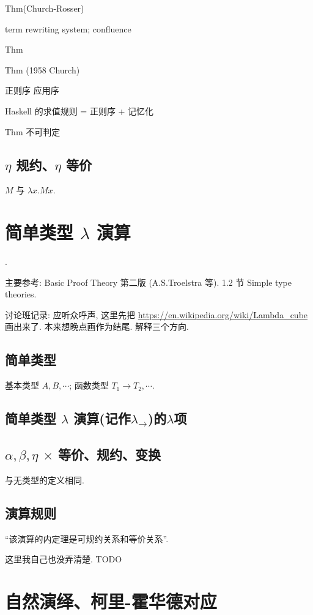\documentclass{article}
\def\a{\alpha}
\def\b{\beta}
\def\l{\lambda}
\begin{document}
Thm(Church-Rosser)

term rewriting system; confluence

Thm

Thm (1958 Church)

正则序 应用序

Haskell 的求值规则 = 正则序 + 记忆化

Thm 不可判定

\subsection{$\eta$ 规约、$\eta$ 等价}

$M$ 与 $\l x.M x$.


\section{简单类型 $\l$ 演算}
.

主要参考: Basic Proof Theory 第二版 (A.S.Troelstra 等). 1.2 节 Simple type theories.

讨论班记录: 应听众呼声, 这里先把 \url{https://en.wikipedia.org/wiki/Lambda_cube}画出来了. 本来想晚点画作为结尾. 解释三个方向.

\subsection{简单类型}

基本类型 $A,B,\cdots$; 函数类型 $T_1\to T_2,\cdots$.

\subsection{简单类型 $\l$ 演算(记作$\l_\to$)的$\l$项}

\subsection{$\a,\b,\eta$ $\times$ 等价、规约、变换}

与无类型的定义相同.

\subsection{演算规则}

``该演算的内定理是可规约关系和等价关系''.

这里我自己也没弄清楚. TODO

\section{自然演绎、柯里-霍华德对应}
\end{document}
